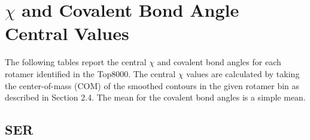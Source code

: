 \section{$\chi$ and Covalent Bond Angle Central Values}
The following tables report the central $\chi$ and covalent bond angles for each rotamer identified in the Top8000. The central $\chi$ values are calculated by taking the center-of-mass (COM) of the smoothed contours in the given rotamer bin as described in Section 2.4. The mean for the covalent bond angles is a simple mean.

\subsection{SER}

\begin{longtable}{ c c }


\end{longtable}
